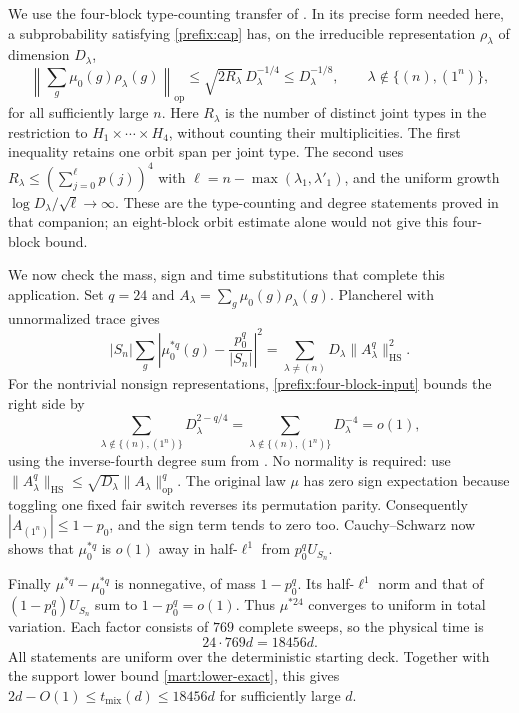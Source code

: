 We use the four-block type-counting transfer of
\cite[Corollary~\ref*{l-l:four-block-reservoir}]{partialFourier}.
In its precise form needed here, a subprobability satisfying
\eqref{prefix:cap} has, on the irreducible representation
$\rho_\lambda$ of dimension $D_\lambda$,
\begin{equation}\label{prefix:four-block-input}
 \left\|\sum_g\mu_0(g)\rho_\lambda(g)\right\|_{\mathrm{op}}
 \le \sqrt{2R_\lambda}\,D_\lambda^{-1/4}
 \le D_\lambda^{-1/8},
 \qquad \lambda\notin\{(n),(1^n)\},
\end{equation}
for all sufficiently large $n$.  Here $R_\lambda$ is the number of
distinct joint types in the restriction to $H_1\times\cdots\times H_4$,
without counting their multiplicities.  The first inequality retains
one orbit span per joint type.  The second uses
$R_\lambda\le(\sum_{j=0}^{\ell}p(j))^4$ with
$\ell=n-\max(\lambda_1,\lambda'_1)$, and the uniform growth
$\log D_\lambda/\sqrt\ell\to\infty$.
These are the type-counting and degree statements proved in that
companion; an eight-block orbit estimate alone would not give this
four-block bound.

We now check the mass, sign and time substitutions that complete this
application.  Set $q=24$ and
$A_\lambda=\sum_g\mu_0(g)\rho_\lambda(g)$.  Plancherel with
unnormalized trace gives
\[
 |S_n|\sum_g\left|\mu_0^{*q}(g)-\frac{p_0^q}{|S_n|}\right|^2
       =\sum_{\lambda\ne(n)}D_\lambda\|A_\lambda^q\|_{\mathrm{HS}}^2.
\]
For the nontrivial nonsign representations,
\eqref{prefix:four-block-input} bounds the right side by
\[
 \sum_{\lambda\notin\{(n),(1^n)\}}
             D_\lambda^{2-q/4}
   =\sum_{\lambda\notin\{(n),(1^n)\}}D_\lambda^{-4}=o(1),
\]
using the inverse-fourth degree sum from
\cite[Theorem~\ref*{l-l:degree-all-powers}]{partialFourier}.
No normality is required: use
$\|A_\lambda^q\|_{\mathrm{HS}}\le
\sqrt{D_\lambda}\|A_\lambda\|_{\mathrm{op}}^q$.
The original law $\mu$ has zero sign expectation because toggling
one fixed fair switch reverses its permutation parity.  Consequently
$|A_{(1^n)}|\le1-p_0$, and the sign term tends to zero too.
Cauchy--Schwarz now shows that $\mu_0^{*q}$ is $o(1)$ away in
half-$\ell^1$ from $p_0^q U_{S_n}$.

Finally $\mu^{*q}-\mu_0^{*q}$ is nonnegative, of mass $1-p_0^q$.
Its half-$\ell^1$ norm and that of $(1-p_0^q)U_{S_n}$ sum to
$1-p_0^q=o(1)$.  Thus $\mu^{*24}$ converges to uniform in total
variation.  Each factor consists of $769$ complete sweeps, so the
physical time is
\[
 24\cdot769d=18456d.
\]
All statements are uniform over the deterministic starting deck.
Together with the support lower bound \eqref{mart:lower-exact}, this gives
$2d-O(1)\le t_{\mathrm{mix}}(d)\le18456d$ for sufficiently large $d$.
